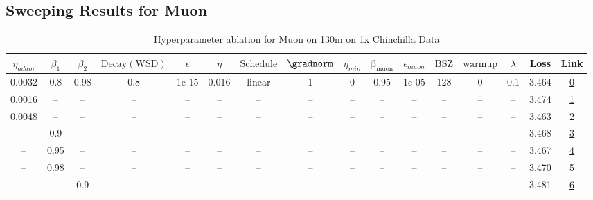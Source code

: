 \subsection{Sweeping Results for Muon}%
\begin{table}[H]
\centering
\caption{Hyperparameter ablation for Muon on 130m on 1x Chinchilla Data}
\label{tab:ablation_muon_130m_on_1x_chinchilla_data}
\begin{tabular}{cccccccccccccccc}
\toprule
$\eta_{adam}$ & $\beta_1$ & $\beta_2$ & $\mathrm{Decay (WSD)}$ & $\epsilon$ & $\eta$ & $\mathrm{Schedule}$ & $\gradnorm$ & $\eta_{min}$ & $\mathrm{\beta_{muon}}$ & $\epsilon_{muon}$ & $\mathrm{BSZ}$ & $\mathrm{warmup}$ & $\lambda$ & Loss & Link \\
\midrule
0.0032 & 0.8 & 0.98 & 0.8 & 1e-15 & 0.016 & linear & 1 & 0 & 0.95 & 1e-05 & 128 & 0 & 0.1 & 3.464 & \href{https://wandb.ai/stanford-mercury/optimizer-scaling/runs/sweep-130m-2B-muon02b4fclr0.016-wd0.1-minlr0-warmup0-b10.8-b20.9-9c2fe9}{0} \\
\midrule
0.0016 & -- & -- & -- & -- & -- & -- & -- & -- & -- & -- & -- & -- & -- & 3.474 & \href{https://wandb.ai/stanford-mercury/optimizer-scaling/runs/sweep-130m-2B-muon89fb4blr0.016-wd0.1-minlr0-warmup0-b10.8-b20.9-2c3744}{1} \\
0.0048 & -- & -- & -- & -- & -- & -- & -- & -- & -- & -- & -- & -- & -- & 3.463 & \href{https://wandb.ai/stanford-mercury/optimizer-scaling/runs/sweep-130m-2B-muon19b6eclr0.016-wd0.1-minlr0-warmup0-b10.8-b20.9-d27415}{2} \\
-- & 0.9 & -- & -- & -- & -- & -- & -- & -- & -- & -- & -- & -- & -- & 3.468 & \href{https://wandb.ai/stanford-mercury/optimizer-scaling/runs/sweep-130m-2B-muon9087d6lr0.016-wd0.1-minlr0-warmup0-b10.9-b20.9-7b1a75}{3} \\
-- & 0.95 & -- & -- & -- & -- & -- & -- & -- & -- & -- & -- & -- & -- & 3.467 & \href{https://wandb.ai/stanford-mercury/optimizer-scaling/runs/sweep-130m-2B-muon4082ddlr0.016-wd0.1-minlr0-warmup0-b10.95-b20.-af0f73}{4} \\
-- & 0.98 & -- & -- & -- & -- & -- & -- & -- & -- & -- & -- & -- & -- & 3.470 & \href{https://wandb.ai/stanford-mercury/optimizer-scaling/runs/sweep-130m-2B-muonb222a7lr0.016-wd0.1-minlr0-warmup0-b10.98-b20.-7cb250}{5} \\
-- & -- & 0.9 & -- & -- & -- & -- & -- & -- & -- & -- & -- & -- & -- & 3.481 & \href{https://wandb.ai/stanford-mercury/optimizer-scaling/runs/sweep-130m-2B-muond0f9b1lr0.016-wd0.1-minlr0-warmup0-b10.8-b20.9-38cfa8}{6} \\

\end{tabular}
\end{table}
